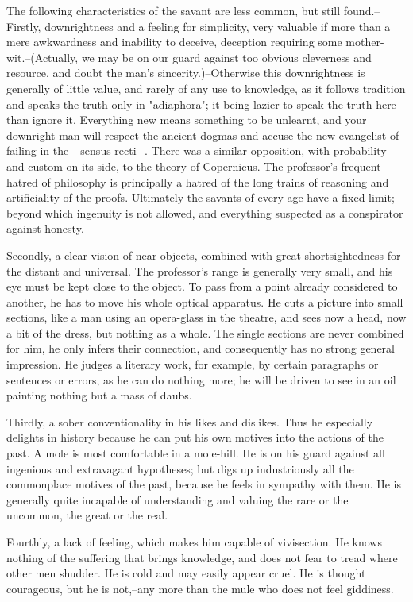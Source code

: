 The following characteristics of the savant are less common, but
still found.--Firstly, downrightness and a feeling for simplicity,
very valuable if more than a mere awkwardness and inability to
deceive, deception requiring some mother-wit.--(Actually, we may be
on our guard against too obvious cleverness and resource, and doubt
the man's sincerity.)--Otherwise this downrightness is generally of
little value, and rarely of any use to knowledge, as it follows
tradition and speaks the truth only in "adiaphora"; it being lazier
to speak the truth here than ignore it. Everything new means
something to be unlearnt, and your downright man will respect the
ancient dogmas and accuse the new evangelist of failing in the
_sensus recti_. There was a similar opposition, with probability and
custom on its side, to the theory of Copernicus. The professor's
frequent hatred of philosophy is principally a hatred of the long
trains of reasoning and artificiality of the proofs. Ultimately the
savants of every age have a fixed limit; beyond which ingenuity is
not allowed, and everything suspected as a conspirator against
honesty.

Secondly, a clear vision of near objects, combined with great
shortsightedness for the distant and universal. The professor's range
is generally very small, and his eye must be kept close to the
object. To pass from a point already considered to another, he has to
move his whole optical apparatus. He cuts a picture into small
sections, like a man using an opera-glass in the theatre, and sees
now a head, now a bit of the dress, but nothing as a whole. The
single sections are never combined for him, he only infers their
connection, and consequently has no strong general impression. He
judges a literary work, for example, by certain paragraphs or
sentences or errors, as he can do nothing more; he will be driven to
see in an oil painting nothing but a mass of daubs.

Thirdly, a sober conventionality in his likes and dislikes. Thus he
especially delights in history because he can put his own motives
into the actions of the past. A mole is most comfortable in a
mole-hill. He is on his guard against all ingenious and extravagant
hypotheses; but digs up industriously all the commonplace motives of
the past, because he feels in sympathy with them. He is generally
quite incapable of understanding and valuing the rare or the
uncommon, the great or the real.

Fourthly, a lack of feeling, which makes him capable of vivisection.
He knows nothing of the suffering that brings knowledge, and does not
fear to tread where other men shudder. He is cold and may easily
appear cruel. He is thought courageous, but he is not,--any more than
the mule who does not feel giddiness.

